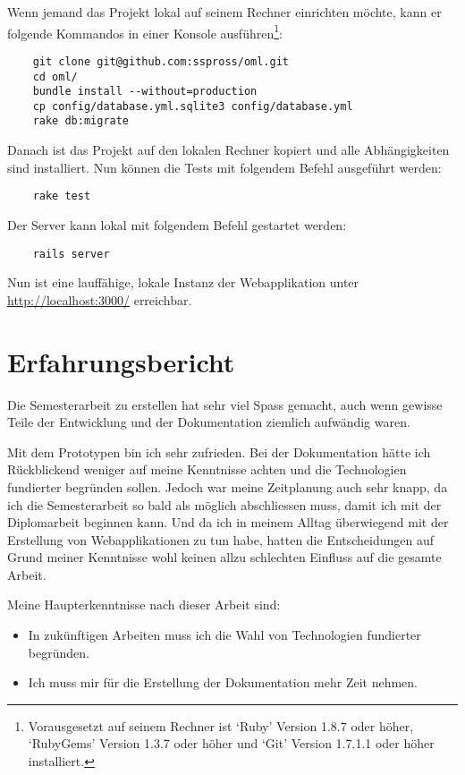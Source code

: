 Wenn jemand das Projekt lokal auf seinem Rechner einrichten möchte, kann er
folgende Kommandos in einer Konsole ausführen\footnote{Vorausgesetzt auf seinem
Rechner ist `Ruby' Version 1.8.7 oder höher, `RubyGems' Version 1.3.7 oder 
höher und `Git' Version 1.7.1.1 oder höher installiert.}:

\begin{verbatim}
    git clone git@github.com:sspross/oml.git
    cd oml/
    bundle install --without=production
    cp config/database.yml.sqlite3 config/database.yml
    rake db:migrate
\end{verbatim}

Danach ist das Projekt auf den lokalen Rechner kopiert und alle Abhängigkeiten
sind installiert. Nun können die Tests mit folgendem Befehl ausgeführt werden:

\begin{verbatim}
    rake test
\end{verbatim}

Der Server kann lokal mit folgendem Befehl gestartet werden:

\begin{verbatim}
    rails server
\end{verbatim}

Nun ist eine lauffähige, lokale Instanz der Webapplikation unter 
\url{http://localhost:3000/} erreichbar.  

\section{Erfahrungsbericht}
Die Semesterarbeit zu erstellen hat sehr viel Spass gemacht, auch wenn gewisse
Teile der Entwicklung und der Dokumentation ziemlich aufwändig waren.

Mit dem Prototypen bin ich sehr zufrieden. Bei der Dokumentation hätte ich
Rückblickend weniger auf meine Kenntnisse achten und die Technologien fundierter
begründen sollen. Jedoch war meine Zeitplanung auch sehr knapp, da ich die 
Semesterarbeit so bald als möglich abschliessen muss, damit ich mit der 
Diplomarbeit beginnen kann. Und da ich in meinem Alltag überwiegend mit der Erstellung von 
Webapplikationen zu tun habe, hatten die Entscheidungen auf Grund meiner Kenntnisse 
wohl keinen allzu schlechten Einfluss auf die gesamte Arbeit.

Meine Haupterkenntnisse nach dieser Arbeit sind:

\begin{itemize}
    \item In zukünftigen Arbeiten muss ich die Wahl von Technologien fundierter begründen.
    \item Ich muss mir für die Erstellung der Dokumentation mehr Zeit nehmen.
\end{itemize}

